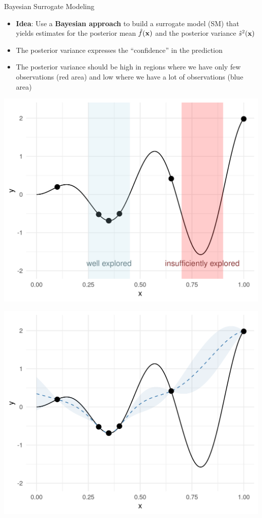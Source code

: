 \documentclass[11pt,compress,t,notes=noshow, xcolor=table]{beamer}
\begin{document}
\begin{vbframe}{Bayesian Surrogate Modeling}
\begin{itemize}
\item \textbf{Idea}: Use a \textbf{Bayesian approach} to build a surrogate model (SM) that yields estimates for the posterior mean $\hat{f}(\mathbf{x})$ and the posterior variance $\hat{s}^2(\mathbf{x})$
\item The posterior variance expresses the \enquote{confidence} in the prediction
\item The posterior variance should be high in regions where we have only few observations (red area) and low where we have a lot of observations (blue area)
\end{itemize}
\begin{minipage}[b]{0.45\textwidth}
  \includegraphics[width = \textwidth]{figure_man/bayesian_loop_ee.png}
\end{minipage}
\hfill
\begin{minipage}[b]{0.45\textwidth}
  \includegraphics[width = \textwidth]{figure_man/bayesian_loop_sm.png}
\end{minipage}


\end{vbframe}
\end{document}

